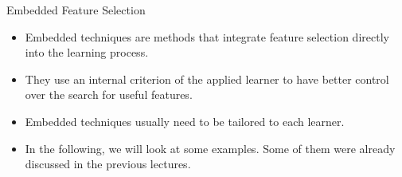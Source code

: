 








\begin{vbframe}{Embedded Feature Selection}

\begin{itemize}
  \item Embedded techniques are methods that integrate feature selection directly into the learning process.
  \item They use an internal criterion of the applied learner to have better control over the search for useful features.
  \item Embedded techniques usually need to be tailored to each learner.
  \item In the following, we will look at some examples.
  Some of them were already discussed in the previous lectures.
\end{itemize}

\end{vbframe}

